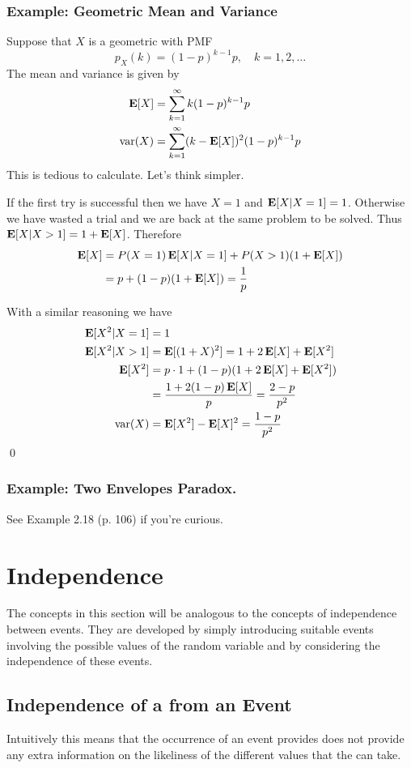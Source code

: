 \subsubsection{Example: Geometric Mean and Variance}
Suppose that $X$ is a geometric \rv with PMF
\[p_X(k)=(1-p)^{k-1}p, \quad k=1,2,\ldots\]
The mean and variance is given by
\begin{align*}
    \operatorname{\textbf{E}}[X] &= \sum_{k=1}^{\infty} k (1-p)^{k-1} p \\
    \text{var}(X) &= \sum_{k=1}^{\infty}(k-\operatorname{\textbf{E}}[X])^2(1-p)^{k-1}p
\end{align*}
This is tedious to calculate. Let's think simpler.

If the first try is successful then we have $X=1$ and $\operatorname{\textbf{E}}[X|X=1]=1$. Otherwise we have wasted a trial and we are back at the same problem to be solved. Thus $\operatorname{\textbf{E}}[X|X>1]=1+\operatorname{\textbf{E}}[X]$.
Therefore 
\begin{align*}
    \operatorname{\textbf{E}}[X] &= P(X=1)\operatorname{\textbf{E}}[X|X=1] + P(X>1)(1+\operatorname{\textbf{E}}[X]) \\
         &= p + (1-p)(1+\operatorname{\textbf{E}}[X]) = \frac{1}{p} \\
\end{align*}

With a similar reasoning we have
\begin{align*}
    \operatorname{\textbf{E}}[X^2|X=1] &= 1 \\
    \operatorname{\textbf{E}}[X^2|X>1] &= \operatorname{\textbf{E}}[(1+X)^2] = 1 + 2\operatorname{\textbf{E}}[X]+\operatorname{\textbf{E}}[X^2] \\
    \operatorname{\textbf{E}}[X^2] &= p \cdot 1 + (1-p)(1+2\operatorname{\textbf{E}}[X]+\operatorname{\textbf{E}}[X^2]) \\
           &= \frac{1+2(1-p)\operatorname{\textbf{E}}[X]}{p} = \frac{2-p}{p^2} \\
    \text{var}(X)&= \operatorname{\textbf{E}}[X^2]-\operatorname{\textbf{E}}[X]^2=\frac{1-p}{p^2}
\end{align*}
\qed
\subsubsection{Example: Two Envelopes Paradox.}
See Example 2.18 (p. 106) \cite{intro-to-prob} if you're curious.

\section{Independence}
The concepts in this section will be analogous to the concepts of independence between events. They are developed by simply introducing suitable events involving the possible values of the random variable and by considering the independence of these events.

\subsection{Independence of a \RV from an Event}
Intuitively this means that the occurrence of an event provides does not provide any extra information on the likeliness of the different values that the \rv can take.

